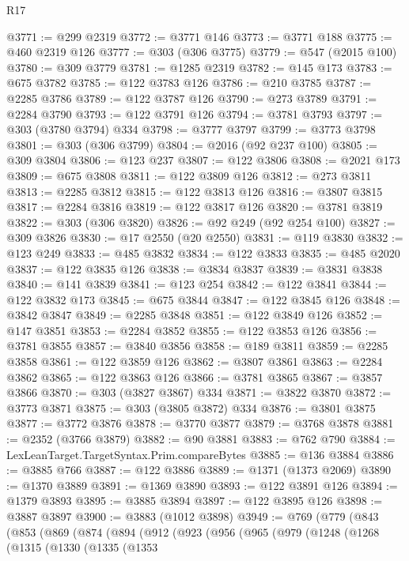 \begin{lexlean}{R17}
\begin{coremodule}
@3771 := @299 @2319
@3772 := @3771 @146
@3773 := @3771 @188
@3775 := @460 @2319 @126
@3777 := @303 (@306 @3775)
@3779 := @547 (@2015 @100)
@3780 := @309 @3779
@3781 := @1285 @2319
@3782 := @145 @173
@3783 := @675 @3782
@3785 := @122 @3783 @126
@3786 := @210 @3785
@3787 := @2285 @3786
@3789 := @122 @3787 @126
@3790 := @273 @3789
@3791 := @2284 @3790
@3793 := @122 @3791 @126
@3794 := @3781 @3793
@3797 := @303 (@3780 @3794) @334
@3798 := @3777 @3797
@3799 := @3773 @3798
@3801 := @303 (@306 @3799)
@3804 := @2016 (@92 @237 @100)
@3805 := @309 @3804
@3806 := @123 @237
@3807 := @122 @3806
@3808 := @2021 @173
@3809 := @675 @3808
@3811 := @122 @3809 @126
@3812 := @273 @3811
@3813 := @2285 @3812
@3815 := @122 @3813 @126
@3816 := @3807 @3815
@3817 := @2284 @3816
@3819 := @122 @3817 @126
@3820 := @3781 @3819
@3822 := @303 (@306 @3820)
@3826 := @92 @249 (@92 @254 @100)
@3827 := @309 @3826
@3830 := @17 @2550 (@20 @2550)
@3831 := @119 @3830
@3832 := @123 @249
@3833 := @485 @3832
@3834 := @122 @3833
@3835 := @485 @2020
@3837 := @122 @3835 @126
@3838 := @3834 @3837
@3839 := @3831 @3838
@3840 := @141 @3839
@3841 := @123 @254
@3842 := @122 @3841
@3844 := @122 @3832 @173
@3845 := @675 @3844
@3847 := @122 @3845 @126
@3848 := @3842 @3847
@3849 := @2285 @3848
@3851 := @122 @3849 @126
@3852 := @147 @3851
@3853 := @2284 @3852
@3855 := @122 @3853 @126
@3856 := @3781 @3855
@3857 := @3840 @3856
@3858 := @189 @3811
@3859 := @2285 @3858
@3861 := @122 @3859 @126
@3862 := @3807 @3861
@3863 := @2284 @3862
@3865 := @122 @3863 @126
@3866 := @3781 @3865
@3867 := @3857 @3866
@3870 := @303 (@3827 @3867) @334
@3871 := @3822 @3870
@3872 := @3773 @3871
@3875 := @303 (@3805 @3872) @334
@3876 := @3801 @3875
@3877 := @3772 @3876
@3878 := @3770 @3877
@3879 := @3768 @3878
@3881 := @2352 (@3766 @3879)
@3882 := @90 @3881
@3883 := @762 @790
@3884 := LexLeanTarget.TargetSyntax.Prim.compareBytes
@3885 := @136 @3884
@3886 := @3885 @766
@3887 := @122 @3886
@3889 := @1371 (@1373 @2069)
@3890 := @1370 @3889
@3891 := @1369 @3890
@3893 := @122 @3891 @126
@3894 := @1379 @3893
@3895 := @3885 @3894
@3897 := @122 @3895 @126
@3898 := @3887 @3897
@3900 := @3883 (@1012 @3898)
@3949 := @769
    (@779
      (@843
        (@853
          (@869
            (@874
              (@894
                (@912
                  (@923
                    (@956
                      (@965
                        (@979
                          (@1248
                            (@1268
                              (@1315
                                (@1330
                                  (@1335
                                    (@1353

\end{coremodule}
\end{lexlean}
